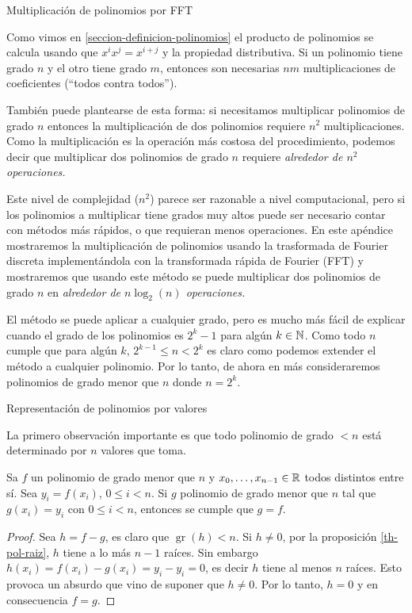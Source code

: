 \begin{chapter}{Multiplicación de polinomios por FFT}\label{apend.FFT}
    

    Como vimos en \ref{seccion-definicion-polinomios} el producto de polinomios se calcula usando  que $x^ix^j = x^{i+j}$ y la propiedad distributiva. Si un polinomio tiene grado $n$ y el otro  tiene grado $m$,  entonces son necesarias $nm$ multiplicaciones de coeficientes (``todos contra todos''). 
        
    También puede plantearse de esta forma:  si necesitamos multiplicar polinomios de grado $n$  entonces la multiplicación de dos polinomios requiere $n^2$ multiplicaciones. Como la multiplicación es la operación más costosa del procedimiento, podemos decir  que  multiplicar dos polinomios de grado $n$ requiere \textit{alrededor de  $n^2$ operaciones.}

    Este nivel de complejidad ($n^2$) parece ser razonable a nivel computacional, pero  si los polinomios a multiplicar tiene grados muy altos puede ser necesario contar con métodos más rápidos, o que requieran menos operaciones. En  este apéndice mostraremos la multiplicación de polinomios usando la trasformada de Fourier discreta implementándola con la transformada rápida de Fourier (FFT) y mostraremos que usando este método se puede multiplicar dos polinomios de grado $n$ en \textit{alrededor de  $n\log_2(n)$ operaciones.}  

    El  método se puede aplicar a cualquier grado, pero es mucho más fácil de explicar cuando el grado de los polinomios es $2^k -1$  para algún $k \in \mathbb N$. Como todo $n$ cumple que para algún $k$, $2^{k-1} \le n < 2^k$ es claro como podemos extender el método a cualquier polinomio. Por lo tanto, de ahora en más consideraremos polinomios de grado menor que $n$ donde  $n = 2^k$. 

    \begin{section}{Representación de polinomios por valores}
    
        La primero observación importante es que todo polinomio de grado  $<n$  está determinado por $n$ valores que toma.

        \begin{proposicion}\label{prop-polinomios-por-valor}
            Sa $f$ un polinomio de grado  menor  que $n$ y $x_0,\ldots,x_{n-1} \in \mathbb R$ todos distintos entre sí. Sea $y_i = f(x_i)$, $0 \le i < n$. Si $g$ polinomio de grado menor que $n$ tal que $g(x_i) = y_i$ con  $0 \le i < n$, entonces se cumple que $g=f$.
        \end{proposicion}
        \begin{proof} Sea $h = f- g$,  es claro que $\operatorname{gr}(h) < n$. Si $h \ne 0$, por la proposición \ref{th-pol-raiz}, $h$ tiene a lo más $n-1$ raíces. Sin embargo $h(x_i)= f(x_i)-g(x_i) = y_i -y_i =0$,  es decir $h$ tiene al menos $n$ raíces. Esto provoca un absurdo que vino de suponer que $h \ne 0$. Por lo tanto,  $h=0$ y en consecuencia $f=g$.   
        \end{proof}


\end{section}
\end{chapter}
